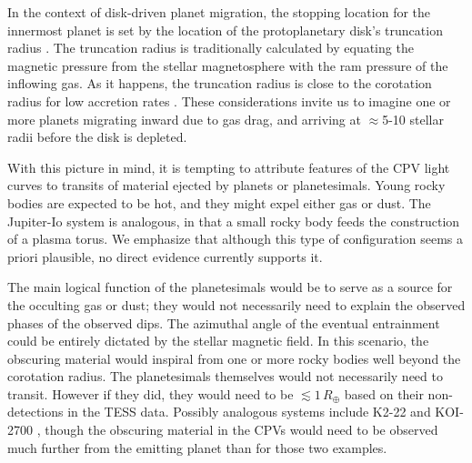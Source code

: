 \documentclass[11pt,twocolumn,tighten]{aastex63}
\begin{document}
In the context of disk-driven planet migration, the stopping location
for the innermost planet is set by the location of the protoplanetary
disk's truncation radius \citep[e.g.][and references therein]{2018haex.bookE.142I}.  The 
truncation radius is traditionally calculated by equating the magnetic
pressure from the stellar magnetosphere with the ram pressure of the
inflowing gas.  As it happens, the truncation radius is close to the
corotation radius for low accretion rates
\citep[e.g.][]{2016ARA&A..54..135H,2022MNRAS.510.5246L}.  These considerations
invite us to imagine one or more planets migrating inward due to gas
drag, and arriving at $\approx$5-10 stellar
radii before the disk is depleted.

With this picture in mind, it is tempting to attribute features of the
CPV light curves to transits of material ejected by planets or
planetesimals.  Young rocky bodies are expected to be hot, and they
might expel either gas or dust.  The Jupiter-Io
system \citep[e.g.][]{2004jpsm.book..537S} is analogous, in that a small rocky
body feeds the construction of a plasma torus.  We emphasize
that although this type of configuration seems a priori plausible, no
direct evidence currently supports it.

The main logical function of the planetesimals would be to serve as a
source for the occulting gas or dust; they would not necessarily need
to explain the observed phases of the observed dips.  The azimuthal
angle of the eventual entrainment could be entirely dictated by the
stellar magnetic field.  In this scenario, the obscuring material
would inspiral from one or more rocky bodies well beyond the
corotation radius.  The planetesimals themselves would not necessarily
need to transit.  However if they did, they would need to be $\lesssim
1$\,$R_\oplus$ based on their non-detections in the TESS data.
Possibly analogous systems include K2-22 \citep{2015ApJ...812..112S}
and KOI-2700 \citep{2014ApJ...784...40R}, though the obscuring
material in the CPVs would need to be observed much further from the
emitting planet than for those two examples.  
\end{document}
